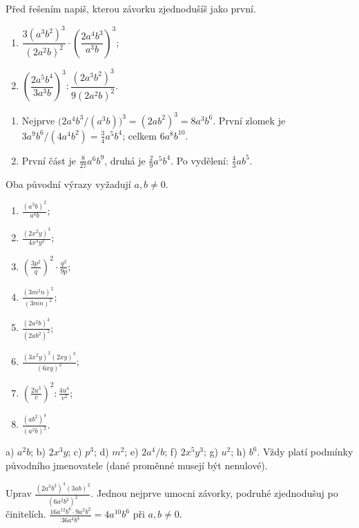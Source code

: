\documentclass[11pt,a4paper]{article}
\begin{document}
\begin{prikladReseniBox}[title={Příklad 3 — dva těžší příklady KISS z předlohy}]
Před řešením napiš, kterou závorku zjednodušíš jako první.
\begin{enumerate}[label=\alph*)]
\item $\dfrac{3(a^3b^2)^3}{(2a^2b)^2}\cdot
\left(\dfrac{2a^4b^3}{a^3b}\right)^3$;
\item $\left(\dfrac{2a^5b^4}{3a^3b}\right)^3:
\dfrac{(2a^3b^2)^3}{9(2a^2b)^2}$.
\end{enumerate}
\tcblower
\begin{enumerate}[label=\alph*)]
\item Nejprve $\bigl(2a^4b^3/(a^3b)\bigr)^3=(2ab^2)^3=8a^3b^6$.
První zlomek je $3a^9b^6/(4a^4b^2)=\frac34a^5b^4$;
celkem $\boxed{6a^8b^{10}}$.
\item První část je $\frac8{27}a^6b^9$, druhá je $\frac29a^5b^4$.
Po vydělení: $\boxed{\frac43ab^5}$.
\end{enumerate}
Oba původní výrazy vyžadují $a,b\ne0$.
\end{prikladReseniBox}
\begin{zadaniReseniBox}[title={Samostatná práce 3 — postup po jednom kroku}]
\begin{enumerate}[label=\alph*)]
\item $\frac{(a^3b)^2}{a^4b}$;
\item $\frac{(2x^2y)^3}{4x^3y^2}$;
\item $\left(\frac{3p^2}{q}\right)^2\cdot\frac{q^2}{9p}$;
\item $\frac{(3m^2n)^2}{(3mn)^2}$;
\item $\frac{(2a^2b)^3}{(2ab^2)^2}$;
\item $\frac{(3x^2y)^2(2xy)^3}{(6xy)^2}$;
\item $\left(\frac{2u^3}{v}\right)^2:\frac{4u^4}{v^2}$;
\item $\frac{(ab^2)^4}{(a^2b)^2}$.
\end{enumerate}
\tcblower
 a) $a^2b$; b) $2x^3y$; c) $p^3$; d) $m^2$;
 e) $2a^4/b$; f) $2x^5y^3$; g) $u^2$; h) $b^6$.
Vždy platí podmínky původního jmenovatele (dané proměnné musejí být nenulové).
\end{zadaniReseniBox}
\begin{zadaniReseniBox}[title={Rozšiřující příklad 3 — dvě cesty},breakable=false]
Uprav $\displaystyle\frac{(2a^3b^2)^4(3ab)^2}{(6a^2b^2)^2}$.
Jednou nejprve umocni závorky, podruhé zjednodušuj po činitelích.
\tcblower
$\frac{16a^{12}b^8\cdot9a^2b^2}{36a^4b^4}=\boxed{4a^{10}b^6}$
při $a,b\ne0$.
\end{zadaniReseniBox}
\end{document}

